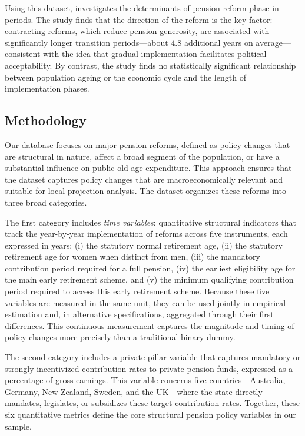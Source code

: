 \documentclass[11pt,english,a4paper, twoside, authoryear]{article}
\begin{document}
Using this dataset, \citet{romp_political_2024} investigates the determinants of pension reform phase-in periods. The study finds that the direction of the reform is the key factor: contracting reforms, which reduce pension generosity, are associated with significantly longer transition periods---about 4.8 additional years on average---consistent with the idea that gradual implementation facilitates political acceptability. By contrast, the study finds no statistically significant relationship between population ageing or the economic cycle and the length of implementation phases.


\subsection{Methodology}

Our database focuses on major pension reforms, defined as policy changes that are structural in nature, affect a broad segment of the population, or have a substantial influence on public old-age expenditure. This approach ensures that the dataset captures policy changes that are macroeconomically relevant and suitable for local-projection analysis. The dataset organizes these reforms into three broad categories.

The first category includes \emph{time variables}: quantitative structural indicators that track the year-by-year implementation of reforms across five instruments, each expressed in years: (i) the statutory normal retirement age, (ii) the statutory retirement age for women when distinct from men, (iii) the mandatory contribution period required for a full pension, (iv) the earliest eligibility age for the main early retirement scheme, and (v) the minimum qualifying contribution period required to access this early retirement scheme. Because these five variables are measured in the same unit, they can be used jointly in empirical estimation and, in alternative specifications, aggregated through their first differences. This continuous measurement captures the magnitude and timing of policy changes more precisely than a traditional binary dummy.


The second category includes a private pillar variable that captures mandatory or strongly incentivized contribution rates to private pension funds, expressed as a percentage of gross earnings. This variable concerns five countries---Australia, Germany, New Zealand, Sweden, and the UK---where the state directly mandates, legislates, or subsidizes these target contribution rates. Together, these six quantitative metrics define the core structural pension policy variables in our sample.
\end{document}
